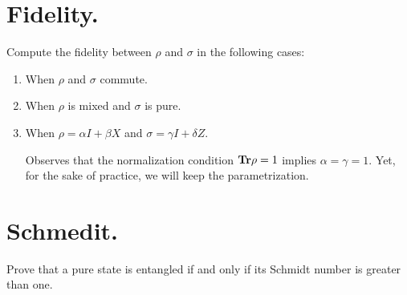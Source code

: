 \documentclass[12pt,a4paper]{article}
\begin{document}
\section{Fidelity.}
Compute the fidelity between $\rho$ and $\sigma$ in the following cases: 
\begin{enumerate}
  \item When $\rho$ and $\sigma$ commute. 



  \item When $\rho$ is mixed and $\sigma$ is pure.  


  \item When $\rho = \alpha I + \beta X $ and $\sigma = \gamma I + \delta Z$.
  \begin{remark}
Observes that the normalization condition $\mathbf{Tr} \rho = 1$ implies $\alpha = \gamma = 1$. Yet, for the sake of practice, we will keep the parametrization.
  \end{remark}

\end{enumerate}





\printbibliography 

\section{Schmedit.}
Prove that a pure state is entangled if and only if its Schmidt number is greater than one.
\end{document}

